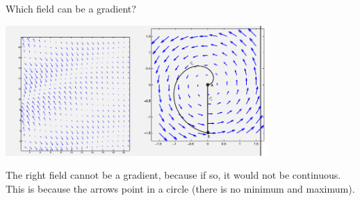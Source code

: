 Which field can be a gradient?

\begin{center}
    \includegraphics[width=0.75\textwidth]{img/e4p1.png}
\end{center}

\begin{solution}
    The right field cannot be a gradient, because if so, it would not be continuous. This is because the arrows point in a circle (there is no minimum and maximum).
\end{solution}